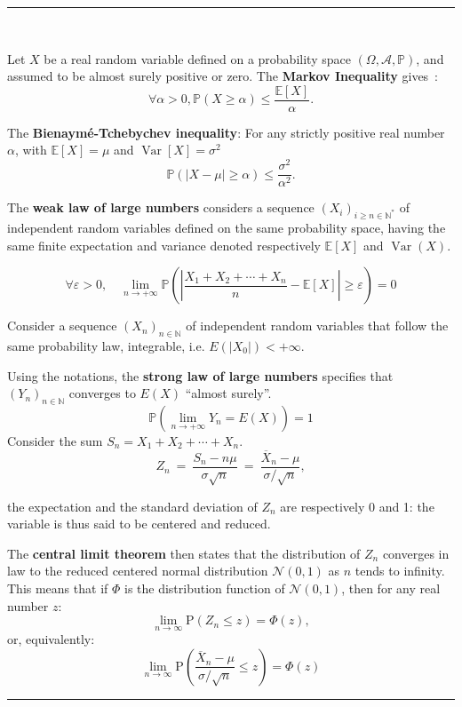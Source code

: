 \hrule
\begin{f} {\ }
	
	Let \(X\) be a real random variable defined on a probability space \(\left(\Omega,\mathcal A,\mathbb P\right)\), and assumed to be almost surely positive or zero. The \textbf{Markov Inequality} gives~:
	\[
	\forall \alpha >0, \mathbb P(X\geq \alpha)\leqslant\frac{\mathbb{E}[X]}{\alpha}.
	\]
	
	The \textbf{Bienaymé-Tchebychev inequality}: 
	For any strictly positive real number \(\alpha\), with \(\mathbb{E}[X]=\mu\) and \(\operatorname{Var}[X]=\sigma^2\)
	\[
	\mathbb{P}\left(\left|X-\mu\right| \geq \alpha \right) \leq \frac{\sigma^2}{\alpha^2}.
	\]
	
	The \textbf{weak law of large numbers} considers a sequence \((X_i)_{i\geq n\in\mathbb{N}^*}\) of independent random variables defined on the same probability space, having the same finite expectation and variance denoted respectively \(\mathbb{E}[X]\) and \(\operatorname{Var}(X)\).
	
	\[
	\forall\varepsilon>0,\quad \lim_{n \to +\infty} \mathbb{P}\left(\left|\frac{X_1+X_2+\cdots+X_n}{n} - \mathbb{E}[X]\right| \geq \varepsilon\right) = 0
	\]
	
	Consider a sequence \((X_n)_{n\in \mathbb{N}}\) of independent random variables that follow the same probability law, integrable, i.e. \(E(|X_0|)<+\infty\).
	
	Using the notations, the \textbf{strong law of large numbers} specifies that \((Y_n)_{n\in\mathbb{N}}\) converges to \(E(X)\) \enquote{almost surely}.
	\[
	\mathbb{P}\left(\lim_{n \to +\infty} Y_n = E(X)\right)=1
	\]
	Consider the sum \(S_n = X_1 + X_2 + \cdots + X_n\).
	\[   
	Z_n\ =\ \frac{S_n - n \mu}{\sigma \sqrt{n}}\ =\ \frac{\overline{X}_n-\mu}{\sigma/\sqrt{n}},
	\]
	
	the expectation and the standard deviation of \(Z_n\) are respectively 0 and 1: the variable is thus said to be centered and reduced.
	
	The \textbf{central limit theorem} then states that the distribution of \(Z_n\) converges in law to the reduced centered normal distribution \(\mathcal{N} (0 , 1)\) as \(n\) tends to infinity. This means that if \(\Phi\) is the distribution function of \(\mathcal{N} (0 , 1)\), then for any real number \(z\):
	\[
	\lim_{n \to \infty} \mbox{P}(Z_n \le z) = \Phi(z),
	\]
	or, equivalently:
	\[
	\lim_{n\to\infty}\mbox{P}\left(\frac{\overline{X}_n-\mu}{\sigma/\sqrt{n}}\leq z\right)=\Phi(z)
	\]
\end{f}
\hrule

